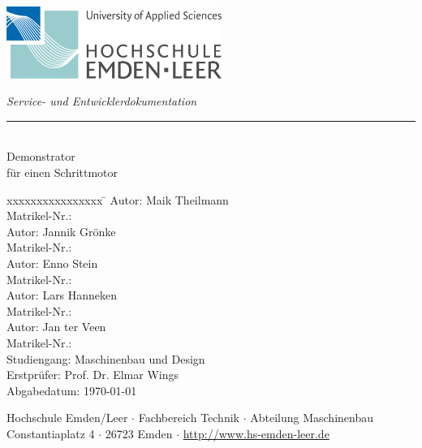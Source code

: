 %
%

\begin{titlepage}
    
    \begin{flushleft} 
        \includegraphics[width=7cm]{General/LogoHSEmdenLeer.jpg}
    \end{flushleft} 
    
    \begin{flushright}
        \vspace{2cm}
        \LARGE \textsl{Service- und Entwicklerdokumentation}\\
        \rule{0.6\textwidth}{0.4pt} ~\\
        \vspace{0.5cm}
        \textsf{\LARGE Demonstrator}\\
        \textsf{\LARGE für einen Schrittmotor}
    \end{flushright}
    
    \vspace{3cm}
    \large
    \begin{tabbing}
        xxxxxxxxxxxxxxxx \= \kill
        Autor:			\> Maik Theilmann \\
        Matrikel-Nr.:	 \\
        Autor:			\> Jannik Grönke \\
        Matrikel-Nr.:	 \\
        Autor:			\> Enno Stein \\
        Matrikel-Nr.:	 \\
        Autor:			\> Lars Hanneken \\
        Matrikel-Nr.:	 \\
        Autor:			\> Jan ter Veen \\
        Matrikel-Nr.:	 \\

        Studiengang: \> Maschinenbau und Design \\ [0.5cm]
        Erstprüfer: \> Prof. Dr. Elmar Wings \\
        Abgabedatum: \> \today \\
    \end{tabbing}
    
  	\vspace{3cm}
    \small
    \begin{center}
        Hochschule Emden/Leer $\cdot$ 
        Fachbereich Technik $\cdot$ 
        Abteilung Maschinenbau \\
        Constantiaplatz 4 $\cdot$ 
        26723 Emden $\cdot$ 
        \url{http://www.hs-emden-leer.de}
    \end{center}
    
\end{titlepage}
